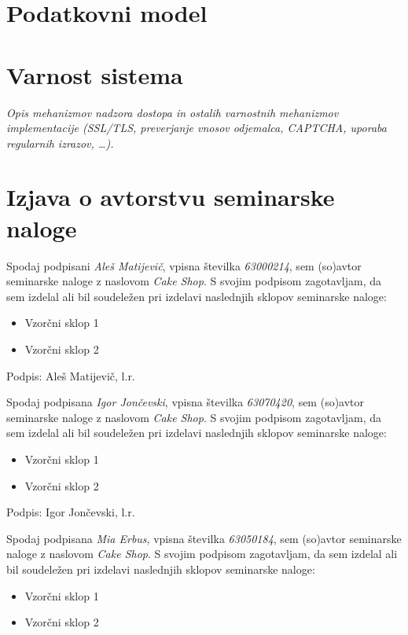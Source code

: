 \documentclass[a4paper,12pt]{report}
\newcommand{\naslov}     {Cake Shop}
\newcommand{\prviavtor}  {Aleš Matijevič}
\newcommand{\prviindeks} {63000214}
\newcommand{\drugiavtor} {Igor Jončevski}
\newcommand{\drugiindeks}{63070420}
\newcommand{\tretjiavtor}{Mia Erbus}
\newcommand{\tretjiindeks}{63050184}
\begin{document}
\chapter{Podatkovni model}


\chapter{Varnost sistema}

{\it Opis mehanizmov nadzora dostopa in ostalih varnostnih mehanizmov implementacije (SSL/TLS, preverjanje vnosov odjemalca, CAPTCHA, uporaba regularnih izrazov, \dots).}

\chapter{Izjava o avtorstvu seminarske naloge}

Spodaj podpisani \textit{\prviavtor}, vpisna številka \textit{\prviindeks}, sem (so)avtor seminarske naloge z naslovom \textit{\naslov}. S svojim podpisom zagotavljam, da sem izdelal ali bil soudeležen pri izdelavi naslednjih sklopov seminarske naloge:
\begin{itemize}
    \item Vzorčni sklop 1
	 \item Vzorčni sklop 2
\end{itemize}

Podpis: {\prviavtor}, l.r.

\newpage

Spodaj podpisana \textit{\drugiavtor}, vpisna številka \textit{\drugiindeks}, sem (so)avtor seminarske naloge z naslovom \textit{\naslov}. S svojim podpisom zagotavljam, da sem izdelal ali bil soudeležen pri izdelavi naslednjih sklopov seminarske naloge:
\begin{itemize}
    \item Vzorčni sklop 1
	 \item Vzorčni sklop 2
\end{itemize}

Podpis: {\drugiavtor}, l.r.

\newpage

Spodaj podpisana \textit{\tretjiavtor}, vpisna številka \textit{\tretjiindeks}, sem (so)avtor seminarske naloge z naslovom \textit{\naslov}. S svojim podpisom zagotavljam, da sem izdelal ali bil soudeležen pri izdelavi naslednjih sklopov seminarske naloge:
\begin{itemize}
    \item Vzorčni sklop 1
	 \item Vzorčni sklop 2
\end{itemize}
\end{document}
